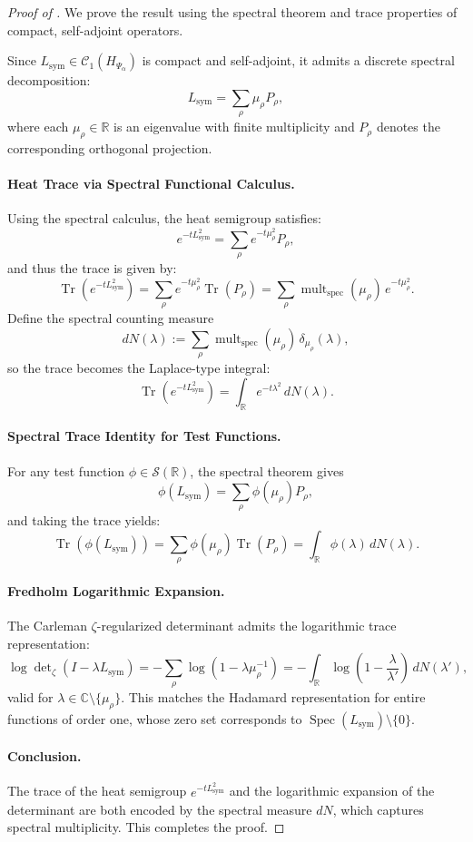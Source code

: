 \begin{proof}[Proof of ]
We prove the result using the spectral theorem and trace properties of compact, self-adjoint operators.

Since \( L_{\mathrm{sym}} \in \mathcal{C}_1(H_{\Psi_\alpha}) \) is compact and self-adjoint, it admits a discrete spectral decomposition:
\[
L_{\mathrm{sym}} = \sum_{\rho} \mu_\rho P_\rho,
\]
where each \( \mu_\rho \in \mathbb{R} \) is an eigenvalue with finite multiplicity and \( P_\rho \) denotes the corresponding orthogonal projection.

\paragraph{Heat Trace via Spectral Functional Calculus.}
Using the spectral calculus, the heat semigroup satisfies:
\[
e^{-t L_{\mathrm{sym}}^2} = \sum_{\rho} e^{-t\mu_\rho^2} P_\rho,
\]
and thus the trace is given by:
\[
\operatorname{Tr}(e^{-t L_{\mathrm{sym}}^2}) = \sum_{\rho} e^{-t\mu_\rho^2} \operatorname{Tr}(P_\rho)
= \sum_{\rho} \operatorname{mult}_{\mathrm{spec}}(\mu_\rho) \, e^{-t\mu_\rho^2}.
\]
Define the spectral counting measure
\[
dN(\lambda) := \sum_{\rho} \operatorname{mult}_{\mathrm{spec}}(\mu_\rho) \, \delta_{\mu_\rho}(\lambda),
\]
so the trace becomes the Laplace-type integral:
\[
\operatorname{Tr}(e^{-t L_{\mathrm{sym}}^2}) = \int_{\mathbb{R}} e^{-t\lambda^2} \, dN(\lambda).
\]

\paragraph{Spectral Trace Identity for Test Functions.}
For any test function \( \phi \in \mathcal{S}(\mathbb{R}) \), the spectral theorem gives
\[
\phi(L_{\mathrm{sym}}) = \sum_{\rho} \phi(\mu_\rho) P_\rho,
\]
and taking the trace yields:
\[
\operatorname{Tr}(\phi(L_{\mathrm{sym}})) = \sum_{\rho} \phi(\mu_\rho) \operatorname{Tr}(P_\rho)
= \int_{\mathbb{R}} \phi(\lambda) \, dN(\lambda).
\]

\paragraph{Fredholm Logarithmic Expansion.}
The Carleman \(\zeta\)-regularized determinant admits the logarithmic trace representation:
\[
\log \det\nolimits_\zeta(I - \lambda L_{\mathrm{sym}})
= - \sum_{\rho} \log\left(1 - \lambda \mu_\rho^{-1} \right)
= - \int_{\mathbb{R}} \log\left(1 - \frac{\lambda}{\lambda'} \right) \, dN(\lambda'),
\]
valid for \( \lambda \in \mathbb{C} \setminus \{ \mu_\rho \} \). This matches the Hadamard representation for entire functions of order one, whose zero set corresponds to \( \operatorname{Spec}(L_{\mathrm{sym}}) \setminus \{0\} \).

\paragraph{Conclusion.}
The trace of the heat semigroup \( e^{-t L_{\mathrm{sym}}^2} \) and the logarithmic expansion of the determinant are both encoded by the spectral measure \( dN \), which captures spectral multiplicity. This completes the proof.
\end{proof}
